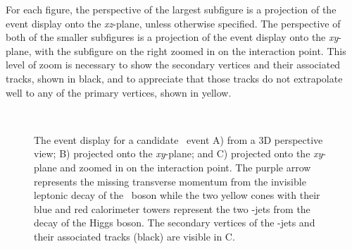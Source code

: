 For each figure, the perspective of the largest subfigure is a projection of the event display onto the \textit{xz}-plane, unless otherwise specified. The perspective of both of the smaller subfigures is a projection of the event display onto the \textit{xy}-plane, with the subfigure on the right zoomed in on the interaction point. This level of zoom is necessary to show the secondary vertices and their associated tracks, shown in black, and to appreciate that those tracks do not extrapolate well to any of the primary vertices, shown in yellow.

\begin{figure}[htbp]
  \centering
  \mbox{
  }
  \mbox{
  }
  \caption[Event Display for \ZnnHbb\ Candidate]{The event display for a candidate \ZnnHbb\ event A) from a 3D perspective view; B) projected onto the \textit{xy}-plane; and C) projected onto the \textit{xy}-plane and zoomed in on the interaction point. The purple arrow represents the missing transverse momentum from the invisible leptonic decay of the \bosZ\ boson while the two yellow cones with their blue and red calorimeter towers represent the two \qrkb-jets from the decay of the Higgs boson. The secondary vertices of the \qrkb-jets and their associated tracks (black) are visible in C.}
  \label{fig:evt_disp_Znn}
\end{figure}

